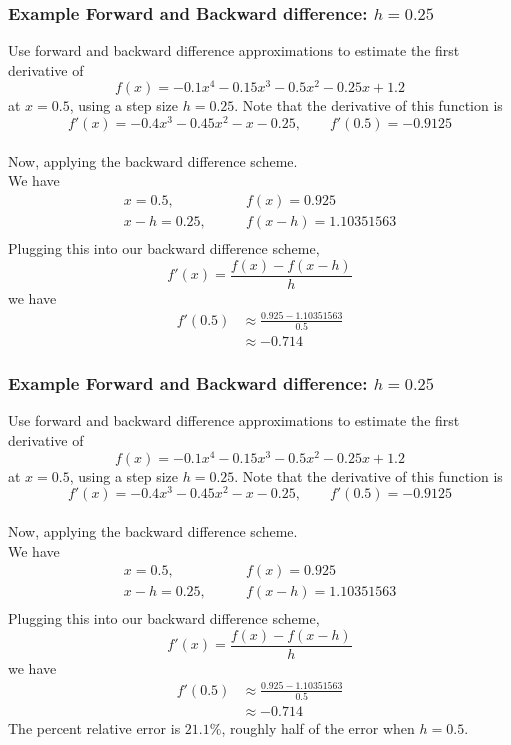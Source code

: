 \documentclass{if-beamer}
\begin{document}
\begin{frame}
\frametitle{Example Forward and Backward difference: $h= 0.25$}
Use forward and backward difference approximations to estimate the first derivative of
$$f(x) = -0.1x^4-0.15x^3-0.5x^2-0.25x+1.2 $$
at $x=0.5$, using a step size $h = 0.25$. Note that the derivative of this function is
$$f'(x) = -0.4x^3-0.45x^2-x-0.25, \qquad f'(0.5) = -0.9125$$
\\\vspace{5pt}
Now, applying the backward difference scheme.\\\vspace{5pt}
We have
\begin{align*}
x = 0.5, \qquad &f(x) = 0.925\\
x-h = 0.25, \qquad &f(x-h) = 1.10351563\\
\end{align*}
Plugging this into our backward difference scheme, 
$$f'(x) = \frac{f(x)-f(x-h)}{h} $$
we have
\begin{align*}
f'(0.5) &\approx \frac{0.925-1.10351563}{0.5} \\
&\approx -0.714
\end{align*}
\end{frame}


\begin{frame}
\frametitle{Example Forward and Backward difference: $h= 0.25$}
Use forward and backward difference approximations to estimate the first derivative of
$$f(x) = -0.1x^4-0.15x^3-0.5x^2-0.25x+1.2 $$
at $x=0.5$, using a step size $h = 0.25$. Note that the derivative of this function is
$$f'(x) = -0.4x^3-0.45x^2-x-0.25, \qquad f'(0.5) = -0.9125$$
\\\vspace{5pt}
Now, applying the backward difference scheme.\\\vspace{5pt}
We have
\begin{align*}
x = 0.5, \qquad &f(x) = 0.925\\
x-h = 0.25, \qquad &f(x-h) = 1.10351563\\
\end{align*}
Plugging this into our backward difference scheme, 
$$f'(x) = \frac{f(x)-f(x-h)}{h} $$
we have
\begin{align*}
f'(0.5) &\approx \frac{0.925-1.10351563}{0.5} \\
&\approx -0.714
\end{align*}
The percent relative error is $21.1\%$, roughly half of the error when $h=0.5$.
\end{frame}
\end{document}
